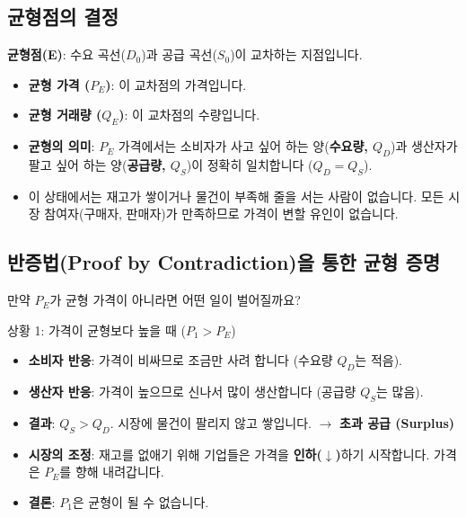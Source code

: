\documentclass[11pt,a4paper]{book}
\theoremstyle{definition}
\begin{document}
\subsection{균형점의 결정}

\textbf{균형점(E)}: 수요 곡선($D_0$)과 공급 곡선($S_0$)이 교차하는 지점입니다.

\begin{itemize}
    \item \textbf{균형 가격 ($P_E$)}: 이 교차점의 가격입니다.
    \item \textbf{균형 거래량 ($Q_E$)}: 이 교차점의 수량입니다.
    \item \textbf{균형의 의미}: $P_E$ 가격에서는 소비자가 사고 싶어 하는 양(\textbf{수요량, $Q_D$})과 생산자가 팔고 싶어 하는 양(\textbf{공급량, $Q_S$})이 정확히 일치합니다 ($Q_D = Q_S$).
    \item 이 상태에서는 재고가 쌓이거나 물건이 부족해 줄을 서는 사람이 없습니다. 모든 시장 참여자(구매자, 판매자)가 만족하므로 가격이 변할 유인이 없습니다.
\end{itemize}

\subsection{반증법(Proof by Contradiction)을 통한 균형 증명}

만약 $P_E$가 균형 가격이 아니라면 어떤 일이 벌어질까요?

\begin{mybox}{상황 1: 가격이 균형보다 높을 때 ($P_1 > P_E$)}
    \begin{itemize}
        \item \textbf{소비자 반응}: 가격이 비싸므로 조금만 사려 합니다 (수요량 $Q_D$는 적음).
        \item \textbf{생산자 반응}: 가격이 높으므로 신나서 많이 생산합니다 (공급량 $Q_S$는 많음).
        \item \textbf{결과}: $Q_S > Q_D$. 시장에 물건이 팔리지 않고 쌓입니다. $\rightarrow$ \textbf{초과 공급 (Surplus)}
        \item \textbf{시장의 조정}: 재고를 없애기 위해 기업들은 가격을 \textbf{인하($\downarrow$)}하기 시작합니다. 가격은 $P_E$를 향해 내려갑니다.
        \item \textbf{결론}: $P_1$은 균형이 될 수 없습니다.
    \end{itemize}
\end{mybox}
\end{document}
